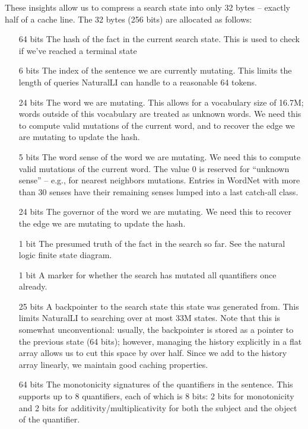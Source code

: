 These insights allow us to compress a search state into only 32 bytes -- exactly half of a cache line.
The 32 bytes (256 bits) are allocated as follows:

\begin{itemize}
  \item[64 bits] The hash of the fact in the current search state.
                 This is used to check if we've reached a terminal state
  \item[6 bits]  The index of the sentence we are currently mutating.
                 This limits the length of queries NaturalLI can handle to a reasonable 64 tokens.
  \item[24 bits] The word we are mutating. This allows for a vocabulary size of 16.7M; words outside
                 of this vocabulary are treated as unknown words. 
                 We need this to compute valid mutations of the current word, and
                 to recover the edge we are mutating to update the hash.
  \item[5 bits]  The word sense of the word we are mutating. 
                 We need this to compute valid mutations of the current word.
                 The value 0 is reserved for ``unknown sense'' -- e.g., for nearest neighbors mutations.                 
                 Entries in WordNet with more than 30
                 senses have their remaining senses lumped into a last catch-all class.
  \item[24 bits] The governor of the word we are mutating.
                 We need this to recover the edge we are mutating to update the hash.
  \item[1 bit]   The presumed truth of the fact in the search so far. See the natural logic 
                 finite state diagram.
  \item[1 bit]   A marker for whether the search has mutated all quantifiers once already.
  \item[25 bits] A backpointer to the search state this state was generated from.
                 This limits NaturalLI to searching over at most 33M states.
                 Note that this is somewhat unconventional: usually, the backpointer is stored as a
                 pointer to the previous state (64 bits); however, managing the history explicitly
                 in a flat array allows us to cut this space by over half.
                 Since we add to the history array linearly, we maintain good caching properties.
  \item[64 bits] The monotonicity signatures of the quantifiers in the sentence.
                 This supports up to 8 quantifiers, each of which is 8 bits: 2 bits for monotonicity and
                 2 bits for additivity/multiplicativity for both the subject and the object of the quantifier.
\end{itemize}



